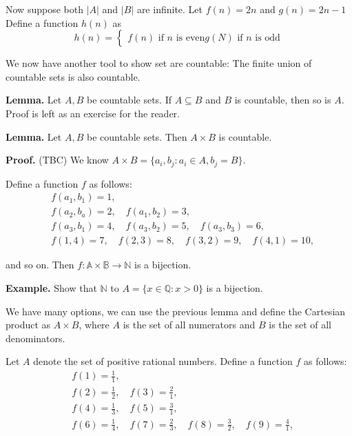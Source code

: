 \documentclass{article}
\begin{document}
    Now suppose both $|A|$ and $|B|$ are infinite. Let $f(n) = 2n$ and $g(n) = 2n - 1$
    Define a function $h(n)$ as 
    $$h(n) = 
    \begin{cases}
        f(n) \text{ if $n$ is even}
        g(N) \text{ if $n$ is odd}
    \end{cases}$$
    
    We now have another tool to show set are countable: The finite union of countable sets is also countable.

    \vspace{1.5mm}
    \textbf{Lemma.} Let $A, B$ be countable sets. If $A \subseteq B$ and $B$ is countable, then so is $A$. Proof is left as an exercise for the reader.
    
    \vspace{1.5mm}
    \textbf{Lemma.} Let $A, B$ be countable sets. Then $A \times B$ is countable.
    
    \vspace{1.5mm}
    \textbf{Proof.} (TBC)
    We know $A \times B = \{a_{i}, b_{j} : a_{i} \in A, b_{j} = B\}$.
    
    Define a function $f$ as follows:
    \begin{align*}
        &f(a_{1}, b_{1}) = 1, \\
        &f(a_{2}, b_{a}) = 2, \quad f(a_{1}, b_{2}) = 3, \\
        &f(a_{3}, b_{1}) = 4, \quad f(a_{3}, b_{2}) = 5, \quad f(a_{3}, b_{3}) = 6, \\
        &f(1,4) = 7, \quad f(2, 3) = 8, \quad f(3, 2) = 9, \quad f(4, 1) = 10,
    \end{align*}
    
    and so on. Then $f: \mathbb{A} \times \mathbb{B} \rightarrow \mathbb{N}$ is a bijection.
    
    
    \textbf{Example.} 
    Show that $\mathbb{N}$ to $A = \{x \in \mathbb{Q}: x > 0\}$ is a bijection.
    
    We have many options, we can use the previous lemma and define the Cartesian product as $A \times B$, where $A$ is the set of all numerators and $B$ is the set of all denominators.
    
    
    Let $A$ denote the set of positive rational numbers. Define a function $f$ as follows:
    \begin{align*}
        & f(1) = \frac{1}{1}, \\
        & f(2) = \frac{1}{2}, \quad f(3) = \frac{2}{1}, \\
        & f(4) = \frac{1}{3}, \quad f(5) = \frac{3}{1}, \\
        & f(6) = \frac{1}{4}, \quad f(7) = \frac{2}{3}, \quad f(8) = \frac{3}{2}, \quad f(9) = \frac{4}{1},
    \end{align*}
\end{document}
